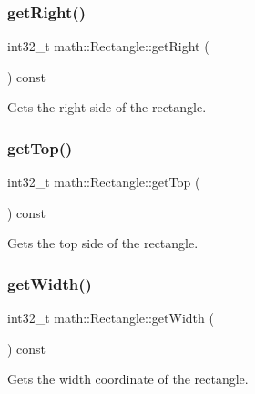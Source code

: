 \subsubsection{\texorpdfstring{getRight()}{getRight()}}
{\footnotesize\ttfamily int32\+\_\+t math\+::\+Rectangle\+::get\+Right (\begin{DoxyParamCaption}{ }\end{DoxyParamCaption}) const\hspace{0.3cm}{\ttfamily [inline]}}



Gets the right side of the rectangle. 

\mbox{\label{structmath_1_1_rectangle_a56871e3f25ebccdf659f6cedb80f7e5d}} 
\subsubsection{\texorpdfstring{getTop()}{getTop()}}
{\footnotesize\ttfamily int32\+\_\+t math\+::\+Rectangle\+::get\+Top (\begin{DoxyParamCaption}{ }\end{DoxyParamCaption}) const\hspace{0.3cm}{\ttfamily [inline]}}



Gets the top side of the rectangle. 

\mbox{\label{structmath_1_1_rectangle_a7c3ff10f2c72c4a880c055ce05d67ea0}} 
\subsubsection{\texorpdfstring{getWidth()}{getWidth()}}
{\footnotesize\ttfamily int32\+\_\+t math\+::\+Rectangle\+::get\+Width (\begin{DoxyParamCaption}{ }\end{DoxyParamCaption}) const\hspace{0.3cm}{\ttfamily [inline]}}



Gets the width coordinate of the rectangle. 

\mbox{\label{structmath_1_1_rectangle_a240081ee7c4b71f345435899e2ec5f14}} 
